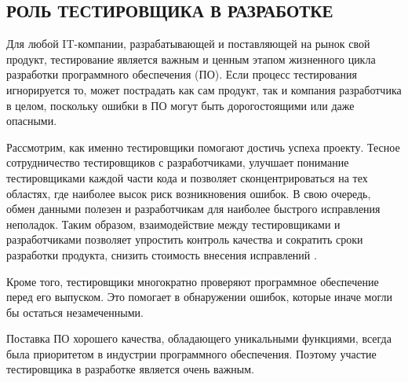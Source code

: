 \subsection{РОЛЬ ТЕСТИРОВЩИКА В РАЗРАБОТКЕ}
Для любой IT-компании, разрабатывающей и поставляющей на рынок свой продукт, 
тестирование является важным и ценным этапом жизненного цикла разработки 
программного обеспечения (ПО). Если процесс тестирования игнорируется то, может 
пострадать как сам продукт, так и компания разработчика в целом, поскольку 
ошибки в ПО могут быть дорогостоящими или даже опасными.

Рассмотрим, как именно тестировщики помогают достичь успеха проекту. Тесное 
сотрудничество тестировщиков с разработчиками, улучшает понимание тестировщиками
каждой части кода и позволяет сконцентрироваться на тех областях, где наиболее 
высок риск возникновения ошибок. В свою очередь, обмен данными полезен и 
разработчикам для наиболее быстрого исправления неполадок. Таким образом, 
взаимодействие между тестировщиками и разработчиками позволяет упростить 
контроль качества и сократить сроки разработки продукта, снизить стоимость 
внесения исправлений \cite{Import_test}.

Кроме того, тестировщики многократно проверяют программное обеспечение перед его 
выпуском. Это помогает в обнаружении ошибок, которые иначе могли бы остаться 
незамеченными.

Поставка ПО хорошего качества, обладающего уникальными функциями, всегда была 
приоритетом в индустрии программного обеспечения. Поэтому участие тестировщика в 
разработке является очень важным.  

